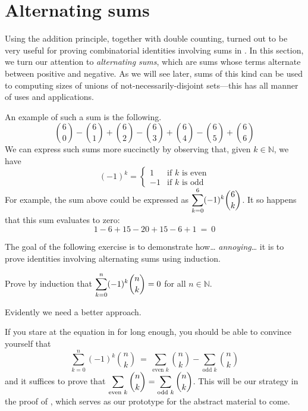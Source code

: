 \section{Alternating sums}

Using the addition principle, together with double counting, turned out to be very useful for proving combinatorial identities involving sums in . In this section, we turn our attention to \textit{alternating sums}, which are sums whose terms alternate between positive and negative. As we will see later, sums of this kind can be used to computing sizes of unions of not-necessarily-disjoint sets---this has all manner of uses and applications.

An example of such a sum is the following.
\[ \binom{6}{0} - \binom{6}{1} + \binom{6}{2} - \binom{6}{3} + \binom{6}{4} - \binom{6}{5} + \binom{6}{6} \]
We can express such sums more succinctly by observing that, given $k \in \mathbb{N}$, we have
\[ (-1)^k = \begin{cases} 1 & \text{if $k$ is even} \\ -1 & \text{if $k$ is odd} \end{cases} \]
For example, the sum above could be expressed as $\displaystyle \sum_{k=0}^6 (-1)^k \dbinom{6}{k}$. It so happens that this sum evaluates to zero:
\[ 1 - 6 + 15 - 20 + 15 - 6 + 1 ~=~ 0 \]

The goal of the following exercise is to demonstrate how\dots{} \textit{annoying}\dots{} it is to prove identities involving alternating sums using induction.

\begin{exercise}
Prove by induction that $\displaystyle \sum_{k=0}^n (-1)^k \dbinom{n}{k} = 0$ for all $n \in \mathbb{N}$.
\end{exercise}

Evidently we need a better approach.

If you stare at the equation in  for long enough, you should be able to convince yourself that
\[ \sum_{k=0}^n (-1)^k \binom{n}{k} ~=~ \sum_{\text{even } k} \binom{n}{k} - \sum_{\text{odd } k} \binom{n}{k} \]
and it suffices to prove that $\displaystyle\sum_{\text{even } k} \dbinom{n}{k} = \sum_{\text{odd } k} \dbinom{n}{k}$. This will be our strategy in the proof of , which serves as our prototype for the abstract material to come.

